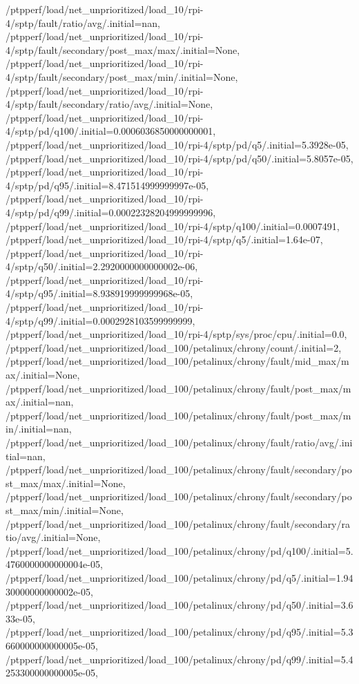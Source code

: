 {    /ptpperf/load/net_unprioritized/load_10/rpi-4/sptp/fault/ratio/avg/.initial=nan,
    /ptpperf/load/net_unprioritized/load_10/rpi-4/sptp/fault/secondary/post_max/max/.initial=None,
    /ptpperf/load/net_unprioritized/load_10/rpi-4/sptp/fault/secondary/post_max/min/.initial=None,
    /ptpperf/load/net_unprioritized/load_10/rpi-4/sptp/fault/secondary/ratio/avg/.initial=None,
    /ptpperf/load/net_unprioritized/load_10/rpi-4/sptp/pd/q100/.initial=0.0006036850000000001,
    /ptpperf/load/net_unprioritized/load_10/rpi-4/sptp/pd/q5/.initial=5.3928e-05,
    /ptpperf/load/net_unprioritized/load_10/rpi-4/sptp/pd/q50/.initial=5.8057e-05,
    /ptpperf/load/net_unprioritized/load_10/rpi-4/sptp/pd/q95/.initial=8.471514999999997e-05,
    /ptpperf/load/net_unprioritized/load_10/rpi-4/sptp/pd/q99/.initial=0.00022328204999999996,
    /ptpperf/load/net_unprioritized/load_10/rpi-4/sptp/q100/.initial=0.0007491,
    /ptpperf/load/net_unprioritized/load_10/rpi-4/sptp/q5/.initial=1.64e-07,
    /ptpperf/load/net_unprioritized/load_10/rpi-4/sptp/q50/.initial=2.2920000000000002e-06,
    /ptpperf/load/net_unprioritized/load_10/rpi-4/sptp/q95/.initial=8.938919999999968e-05,
    /ptpperf/load/net_unprioritized/load_10/rpi-4/sptp/q99/.initial=0.0002928103599999999,
    /ptpperf/load/net_unprioritized/load_10/rpi-4/sptp/sys/proc/cpu/.initial=0.0,
    /ptpperf/load/net_unprioritized/load_100/petalinux/chrony/count/.initial=2,
    /ptpperf/load/net_unprioritized/load_100/petalinux/chrony/fault/mid_max/max/.initial=None,
    /ptpperf/load/net_unprioritized/load_100/petalinux/chrony/fault/post_max/max/.initial=nan,
    /ptpperf/load/net_unprioritized/load_100/petalinux/chrony/fault/post_max/min/.initial=nan,
    /ptpperf/load/net_unprioritized/load_100/petalinux/chrony/fault/ratio/avg/.initial=nan,
    /ptpperf/load/net_unprioritized/load_100/petalinux/chrony/fault/secondary/post_max/max/.initial=None,
    /ptpperf/load/net_unprioritized/load_100/petalinux/chrony/fault/secondary/post_max/min/.initial=None,
    /ptpperf/load/net_unprioritized/load_100/petalinux/chrony/fault/secondary/ratio/avg/.initial=None,
    /ptpperf/load/net_unprioritized/load_100/petalinux/chrony/pd/q100/.initial=5.4760000000000004e-05,
    /ptpperf/load/net_unprioritized/load_100/petalinux/chrony/pd/q5/.initial=1.9430000000000002e-05,
    /ptpperf/load/net_unprioritized/load_100/petalinux/chrony/pd/q50/.initial=3.633e-05,
    /ptpperf/load/net_unprioritized/load_100/petalinux/chrony/pd/q95/.initial=5.3660000000000005e-05,
    /ptpperf/load/net_unprioritized/load_100/petalinux/chrony/pd/q99/.initial=5.4253300000000005e-05,
}
